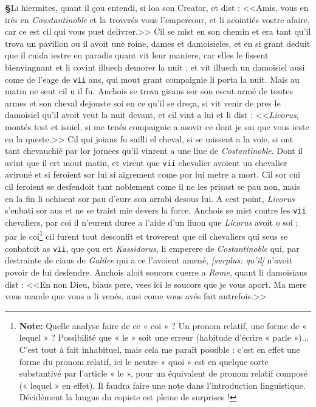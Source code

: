 \documentclass[12pt]{article} %
\newcommand{\persName}[1]{\emph{#1}} %
\newcommand{\placeName}[1]{\emph{#1}} %
\newcommand{\num}[1]{\texttt{#1}}    %
\newcommand{\supplied}[1]{\textlangle#1\textrangle} %
\newcommand{\fnnote}[1]{\footnote{\textbf{Note:} #1}} %
\newcommand{\surplus}[1]{\textit{[surplus: #1]}} %
\newcounter{paranum}
\newcommand{\pnum}{\stepcounter{paranum}\textbf{§\arabic{paranum}}\quad}
\begin{document}
\pnum \lettrine[lines=3]{\color{darkred}L}{i} hiermites, quant il çou entendi, si loa son Creator, et dist : <<Amis, vous en irés en \placeName{Coustantinoble} et la troverés vous l'empereour, et li acointiés vostre afaire, car ce est cil qui vous puet delivrer.>> Cil se mist en son chemin et era tant qu'il trova un pavillon ou il avoit une roine, dames et damoisieles, et en si grant deduit que il cuida iestre en paradis quant vit leur maniere, car elles le fissent bienvingnant et li covint illuech demorer la nuit ; et vit illuech un damoisiel ausi come de l'eage de \num{vii} ans, qui mout grant compaignie li porta la nuit. Mais au matin ne seut cil u il fu. Anchois se trova gisans sor son escut armé de toutes armes et son cheval dejouste soi en ce qu'il se dreça, si vit venir de pres le damoisiel qu'il avoit veut la nuit devant, et cil vint a lui et li dist : <<\persName{Licorus}, montés tost et isniel, si me tenés compaignie a asovir ce dont je sai que vous ieste en la queste.>> Cil qui joians fu sailli el cheval, si se missent a la voie, si ont tant chevauchié par lor jornees qu'il vinrent a une liue de \placeName{Costantinoble}. Dont il avint que il ert mout matin, et virent que \num{vii} chevalier avoient un chevalier avironé et si feroient sor lui si aigrement come por lui metre a mort. Cil sor cui cil feroient se desfendoit tant noblement come il ne les prisast se pau non, mais en la fin li ochisent sor pau d'eure son arrabi desous lui. A cest point, \persName{Licorus} s'enbati sor aus et ne se traist mie devers la force. Anchois se mist contre le\supplied{s} \num{vii} chevaliers, par coi il n'eurent duree a l'aide d'un liuon que \persName{Licorus} avoit o soi ; par le coi\fnnote{Quelle analyse faire de ce « coi » ? Un pronom relatif, une forme de « lequel » ? Possibilité que « le » soit une erreur (habitude d'écrire « parle »)... C'est tout à fait inhabituel, mais cela me paraît possible : c'est en effet une forme du pronom relatif, ici le neutre « quoi » est en quelque sorte substantivé par l'article « le », pour un équivalent de pronom relatif composé (« lequel » en effet). Il faudra faire une note dans l'introduction linguistique. Décidément la langue du copiste est pleine de surprises !} cil furent tout desconfit et trovere\supplied{n}t que cil chevaliers qui seus se conbatoit as \num{vii}, que çou ert \persName{Kassidorus}, li emperere de \placeName{Costantinoble} qui, par destrainte de ciaus de \placeName{Galilee} qui a ce l'avoient amené, \surplus{qu'il} n'avoit povoir de lui desfendre. Anchois aloit soucors cuerre a \placeName{Rome}, quant li damoisiaus dist : <<En non Dieu, biaus pere, vees ici le soucors que je vous aport. Ma mere vous mande que vous a li venés, ausi come vous avés fait autrefois.>>
\end{document}
